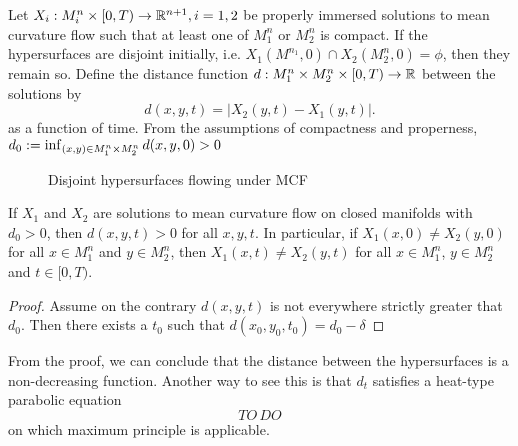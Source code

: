 Let $X_i: M^n_i \times  [0, T) \to \mathbb{R}^{n+1}, i = 1,2 $ be properly immersed solutions to mean curvature flow such that at least one of  $ M^n_1$ or $M^n_2$ is compact. 
If the hypersurfaces are disjoint initially, i.e. $X_1(M^{n_1},0)\cap X_2(M^n_2,0) = \phi$, then they remain so. Define the distance function $d: M^n_1 \times M^n_2 \times  [0,T) \to \mathbb{R}$ between the solutions by \[
d(x,y,t) = |X_2(y,t) - X_1(y,t)|
.\] 
as a function of time. From the assumptions of compactness and properness, $d_0 := \inf_{(x,y) \in M^n_1 \times M^n_2} d(x,y,0) >0$
\begin{figure}[h]
\centering
{}
\caption{Disjoint hypersurfaces flowing under MCF}
\end{figure}
\begin{thm}
If $X_1$ and $X_2$ are solutions to mean curvature flow on closed manifolds with $ d_{0}>0$, then $ d(x,y,t)>0$ for all $ x,y,t$. In particular, if $ X_1(x,0) \neq X_2(y,0)$ for all $x \in M^n_1  $ and $ y \in M^n_2$, then $ X_1(x,t) \neq X_2(y,t)$ for all $ x \in M^{n}_1$, $y \in  M^n_2$ and $ t \in  [0,T)$. 
\end{thm}
\begin{proof}
Assume on the contrary $ d(x,y,t)$ is not everywhere strictly greater that $ d_{0} $. Then there exists a $ t_{0} $ such that $ d(x_{0},y_{0},t_{0}) = d_{0} - \delta $
\end{proof}
\begin{remark}
From the proof, we can conclude that the distance between the hypersurfaces is a non-decreasing function. Another way to see this is that $ d_{t} $ satisfies a heat-type parabolic equation 
    \[ TO\, DO \]
 on which maximum principle is applicable. 
\end{remark}
